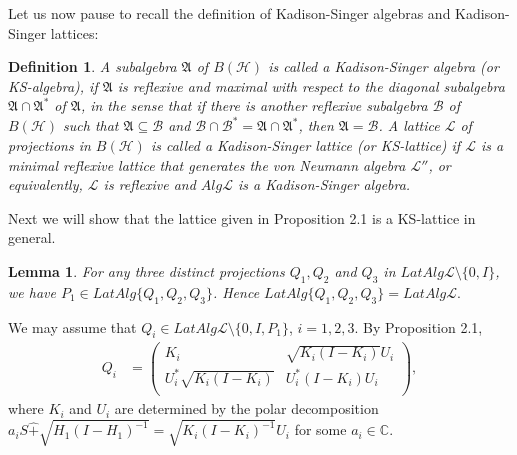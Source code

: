 \documentclass[12pt]{article}
\newtheorem{lemma}{Lemma}[section]
\newtheorem{df}{Definition}[section]
\newcommand{\AAA}{\mathfrak A}
\newcommand{\HHH}{\mathcal H} %
\newcommand{\LLL}{\mathcal L} %
\newcommand{\C}{\mathbb C} %
\def\L{{\mathcal{L}}}
\begin{document}
{Let us now pause to recall the definition of  Kadison-Singer algebras and Kadison-Singer lattices:

\begin{df}
A subalgebra $\AAA$ of $B(\HHH)$ is called a Kadison-Singer algebra (or
KS-algebra), if $\AAA$ is reflexive and maximal with respect
to the diagonal subalgebra $\AAA \cap \AAA^*$ of
$\AAA$, in the sense that if there is another reflexive
subalgebra $\mathcal{B}$ of $B(\HHH)$ such that
$\AAA \subseteq\mathcal{B}$ and
$\mathcal{B}\cap\mathcal{B}^*=\AAA \cap\AAA^*$, then
$\AAA=\mathcal{B}$. A lattice $\L$ of projections in $B(\HHH)$ is
called a Kadison-Singer lattice (or KS-lattice) if $\L$ is a minimal
reflexive lattice that generates the von Neumann algebra $\L''$, or
equivalently, $\L$ is reflexive and $Alg\L$ is a Kadison-Singer
algebra.
\end{df}

Next we will show that the lattice given in Proposition 2.1 is a KS-lattice in general.

\begin{lemma}
For any three distinct projections $Q_1, Q_2$ and $Q_3$ in
$LatAlg\LLL \setminus \{0, I \}$, we have $P_{1} \in LatAlg\{
Q_{1}, Q_{2}, Q_{3}\}$. Hence $LatAlg\{Q_{1}, Q_{2},
Q_{3}\}=LatAlg\L.$
\end{lemma}

\quad
We may assume that $Q_i\in LatAlg\LLL
\setminus \{0, I, P_1 \}$, $i = 1,2,3$. By Proposition 2.1,
\begin{align*}
Q_{i}& =\left(
          \begin{array}{cc}
            K_{i} & \sqrt{K_{i}(I-K_{i})}U_{i} \\
            U_{i}^{*}\sqrt{K_{i}(I-K_{i})} & U_{i}^{*}(I-K_{i})U_{i} \\
          \end{array}
        \right),
\end{align*}
where $K_i$ and $U_i$ are determined by the polar decomposition
$a_{i}S \widehat{+}
\sqrt{H_{1}(I-H_{1})^{-1}}=\sqrt{K_{i}(I-K_{i})^{-1}} U_{i}$ for
some $a_{i} \in \C$.

}
\end{document}
